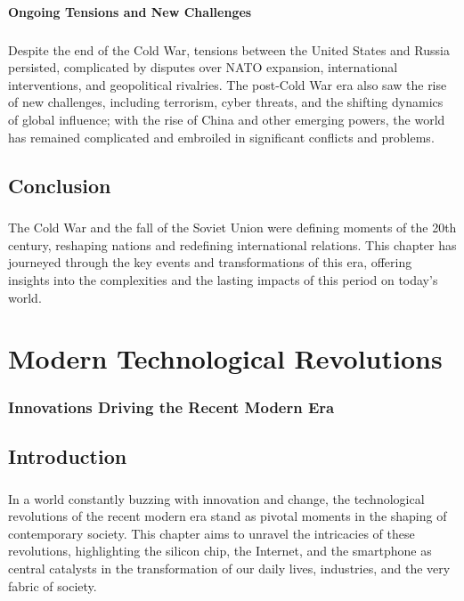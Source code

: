 \documentclass[a4paper,12pt]{book}
\begin{document}
\subsubsection*{Ongoing Tensions and New Challenges}
\paragraph{}
Despite the end of the Cold War, tensions between the United States and Russia persisted, complicated by disputes over NATO expansion, international interventions, and geopolitical rivalries. The post-Cold War era also saw the rise of new challenges, including terrorism, cyber threats, and the shifting dynamics of global influence; with the rise of China and other emerging powers, the world has remained complicated and embroiled in significant conflicts and problems.

\section*{Conclusion}
\paragraph{}
The Cold War and the fall of the Soviet Union were defining moments of the 20th century, reshaping nations and redefining international relations. This chapter has journeyed through the key events and transformations of this era, offering insights into the complexities and the lasting impacts of this period on today’s world.

\chapter{Modern Technological Revolutions}
\subsection*{Innovations Driving the Recent Modern Era}

\section*{Introduction}
\paragraph{}
In a world constantly buzzing with innovation and change, the technological revolutions of the recent modern era stand as pivotal moments in the shaping of contemporary society. This chapter aims to unravel the intricacies of these revolutions, highlighting the silicon chip, the Internet, and the smartphone as central catalysts in the transformation of our daily lives, industries, and the very fabric of society.
\end{document}
